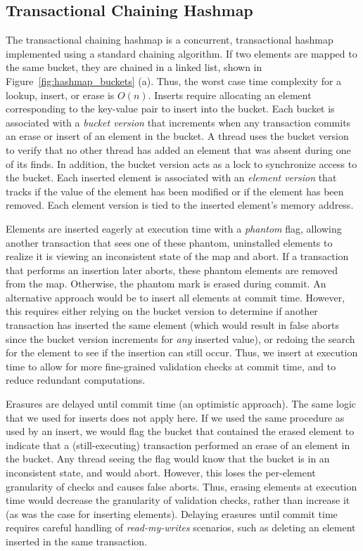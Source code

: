 \subsection{Transactional Chaining Hashmap}
The transactional chaining hashmap is a concurrent, transactional hashmap implemented using a standard chaining algorithm. If two elements are mapped to the same bucket, they are chained in a linked list, shown in Figure~\ref{fig:hashmap_buckets} (a). Thus, the worst case time complexity for a lookup, insert, or erase is $O(n)$. Inserts require allocating an element corresponding to the key-value pair to insert into the bucket. Each bucket is associated with a \emph{bucket version} that increments when any transaction commits an erase or insert of an element in the bucket. A thread uses the bucket version to verify that no other thread has added an element that was absent during one of its finds. In addition, the bucket version acts as a lock to synchronize access to the bucket. Each inserted element is associated with an \emph{element version} that tracks if the value of the element has been modified or if the element has been removed. Each element version is tied to the inserted element's memory address.

Elements are inserted eagerly at execution time with a \emph{phantom} flag, allowing another transaction that sees one of these phantom, uninstalled elements to realize it is viewing an inconsistent state of the map and abort. If a transaction that performs an insertion later aborts, these phantom elements are removed from the map. Otherwise, the phantom mark is erased during commit. An alternative approach would be to insert all elements at commit time. However, this requires either relying on the bucket version to determine if another transaction has inserted the same element (which would result in false aborts since the bucket version increments for \emph{any} inserted value), or redoing the search for the element to see if the insertion can still occur. Thus, we insert at execution time to allow for more fine-grained validation checks at commit time, and to reduce redundant computations. 

Erasures are delayed until commit time (an optimistic approach). The same logic that we used for inserts does not apply here. If we used the same procedure as used by an insert, we would flag the bucket that contained the erased element to indicate that a (still-executing) transaction performed an erase of an element in the bucket. Any thread seeing the flag would know that the bucket is in an inconsistent state, and would abort. However, this loses the per-element granularity of checks and causes false aborts. Thus, erasing elements at execution time would decrease the granularity of validation checks, rather than increase it (as was the case for inserting elements).
Delaying erasures until commit time requires careful handling of \emph{read-my-writes} scenarios, such as deleting an element inserted in the same transaction.

